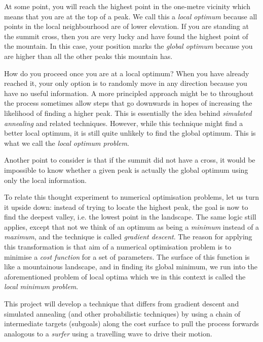 At some point, you will reach the highest point in the one-metre vicinity which means that you are at the top of a peak. 
We call this a \textit{local optimum} because all points in the local neighbourhood are of lower elevation.
If you are standing at the summit cross, then you are very lucky and have found the highest point of the mountain.
In this case, your position marks the \textit{global optimum} because you are higher than all the other peaks this mountain has.

How do you proceed once you are at a local optimum?
When you have already reached it, your only option is to randomly move in any direction because you have no useful information.
A more principled approach might be to throughout the process sometimes allow steps that go downwards in hopes of increasing the likelihood of finding a higher peak.
This is essentially the idea behind \textit{simulated annealing} and related techniques.
However, while this technique might find a better local optimum, it is still quite unlikely to find the global optimum.
This is what we call the \textit{local optimum problem}.

Another point to consider is that if the summit did not have a cross, it would be impossible to know whether a given peak is actually the global optimum using only the local information.

To relate this thought experiment to numerical optimisation problems, let us turn it upside down: instead of trying to locate the highest peak, the goal is now to find the deepest valley, i.e. the lowest point in the landscape. 
The same logic still applies, except that not we think of an optimum as being a \textit{minimum} instead of a \textit{maximum}, and the technique is called \textit{gradient descent}.
The reason for applying this transformation is that aim of a numerical optimisation problem is to minimise a \textit{cost function} for a set of parameters. 
The surface of this function is like a mountainous landscape, and in finding its global minimum, we run into the aforementioned problem of local optima which we in this context is called the \textit{local minimum problem}.

This project will develop a technique that differs from gradient descent and simulated annealing (and other probabilistic techniques) by using a chain of intermediate targets (subgoals) along the cost surface to pull the process forwards analogous to a \textit{surfer} using a travelling wave to drive their motion. 

